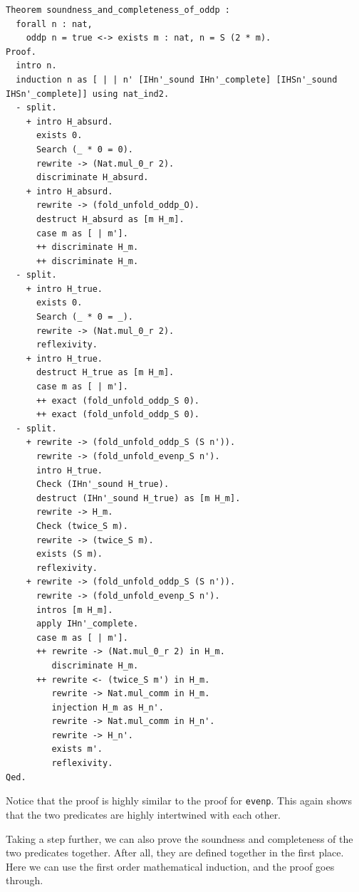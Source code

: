 \documentclass{article}
\begin{document}
\begin{lstlisting}
Theorem soundness_and_completeness_of_oddp :
  forall n : nat,
    oddp n = true <-> exists m : nat, n = S (2 * m).
Proof.
  intro n.
  induction n as [ | | n' [IHn'_sound IHn'_complete] [IHSn'_sound IHSn'_complete]] using nat_ind2.
  - split.
    + intro H_absurd.
      exists 0.
      Search (_ * 0 = 0).
      rewrite -> (Nat.mul_0_r 2).
      discriminate H_absurd.
    + intro H_absurd.
      rewrite -> (fold_unfold_oddp_O).
      destruct H_absurd as [m H_m].
      case m as [ | m'].
      ++ discriminate H_m.
      ++ discriminate H_m.
  - split.
    + intro H_true.
      exists 0.
      Search (_ * 0 = _).
      rewrite -> (Nat.mul_0_r 2).
      reflexivity.
    + intro H_true.
      destruct H_true as [m H_m].
      case m as [ | m'].
      ++ exact (fold_unfold_oddp_S 0).
      ++ exact (fold_unfold_oddp_S 0).
  - split.
    + rewrite -> (fold_unfold_oddp_S (S n')).
      rewrite -> (fold_unfold_evenp_S n').
      intro H_true.
      Check (IHn'_sound H_true).
      destruct (IHn'_sound H_true) as [m H_m].
      rewrite -> H_m.
      Check (twice_S m).
      rewrite -> (twice_S m).
      exists (S m).
      reflexivity.
    + rewrite -> (fold_unfold_oddp_S (S n')).
      rewrite -> (fold_unfold_evenp_S n').
      intros [m H_m].
      apply IHn'_complete.
      case m as [ | m'].
      ++ rewrite -> (Nat.mul_0_r 2) in H_m.
         discriminate H_m.
      ++ rewrite <- (twice_S m') in H_m.
         rewrite -> Nat.mul_comm in H_m.
         injection H_m as H_n'.
         rewrite -> Nat.mul_comm in H_n'.
         rewrite -> H_n'.
         exists m'.
         reflexivity.
Qed.
\end{lstlisting}
Notice that the proof is highly similar to the proof for \texttt{evenp}. This again shows that the two predicates are highly intertwined with each other.

Taking a step further, we can also prove the soundness and completeness of the two predicates together. After all, they are defined together in the first place. Here we can use the first order mathematical induction, and the proof goes through. 
\end{document}
